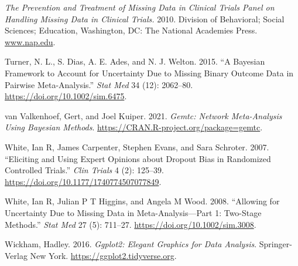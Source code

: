 \begin{CSLReferences}{1}{0}
\leavevmode{}%
\emph{The Prevention and Treatment of Missing Data in Clinical Trials Panel on Handling Missing Data in Clinical Trials.} 2010. Division of Behavioral; Social Sciences; Education, Washington, DC: The National Academies Press. \href{https://www.nap.edu}{www.nap.edu}.

\leavevmode{}%
Turner, N. L., S. Dias, A. E. Ades, and N. J. Welton. 2015. {``A Bayesian Framework to Account for Uncertainty Due to Missing Binary Outcome Data in Pairwise Meta-Analysis.''} \emph{Stat Med} 34 (12): 2062--80. \url{https://doi.org/10.1002/sim.6475}.

\leavevmode{}%
van Valkenhoef, Gert, and Joel Kuiper. 2021. \emph{Gemtc: Network Meta-Analysis Using Bayesian Methods}. \url{https://CRAN.R-project.org/package=gemtc}.

\leavevmode{}%
White, Ian R, James Carpenter, Stephen Evans, and Sara Schroter. 2007. {``Eliciting and Using Expert Opinions about Dropout Bias in Randomized Controlled Trials.''} \emph{Clin Trials} 4 (2): 125--39. \url{https://doi.org/10.1177/1740774507077849}.

\leavevmode{}%
White, Ian R, Julian P T Higgins, and Angela M Wood. 2008. {``Allowing for Uncertainty Due to Missing Data in Meta-Analysis---Part 1: Two-Stage Methods.''} \emph{Stat Med} 27 (5): 711--27. \url{https://doi.org/10.1002/sim.3008}.

\leavevmode{}%
Wickham, Hadley. 2016. \emph{Ggplot2: Elegant Graphics for Data Analysis}. Springer-Verlag New York. \url{https://ggplot2.tidyverse.org}.

\end{CSLReferences}



\address{%
Loukia M. Spineli\\
Midwifery Research and Education Unit\\%
Hannover Medical School\\ Carl-Neuber-Strasse 1, 30625, Hannover, Germany\\
%
\url{https://www.github.com/LoukiaSpin}\\%
\textit{ORCiD: \href{https://orcid.org/0000-0001-9515-582X}{0000-0001-9515-582X}}\\%
\href{mailto:Spineli.Loukia@mh-hannover.de}{\nolinkurl{Spineli.Loukia@mh-hannover.de}}%
}

